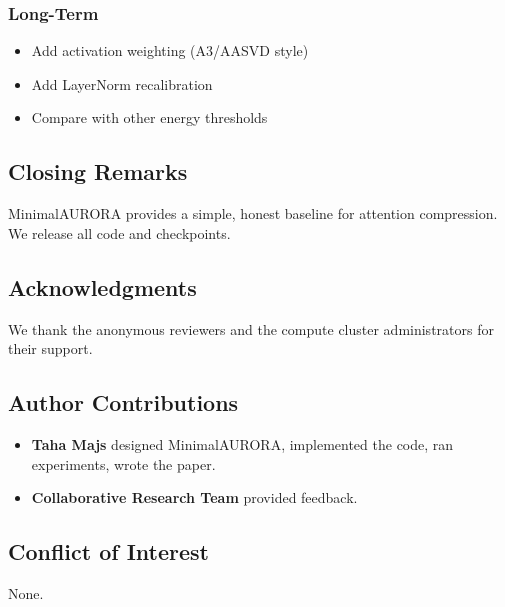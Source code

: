 \subsubsection{Long-Term}
\begin{itemize}
\item Add activation weighting (A3/AASVD style)
\item Add LayerNorm recalibration
\item Compare with other energy thresholds

\end{itemize}
\subsection{Closing Remarks}

MinimalAURORA provides a simple, honest baseline for attention 
compression. We release all code and checkpoints.

\subsection{Acknowledgments}

We thank the anonymous reviewers and the compute cluster administrators for their support.

\subsection{Author Contributions}

\begin{itemize}
\item \textbf{Taha Majs} designed MinimalAURORA, implemented the code, ran
  experiments, wrote the paper.
\item \textbf{Collaborative Research Team} provided feedback.

\end{itemize}
\subsection{Conflict of Interest}

None.

